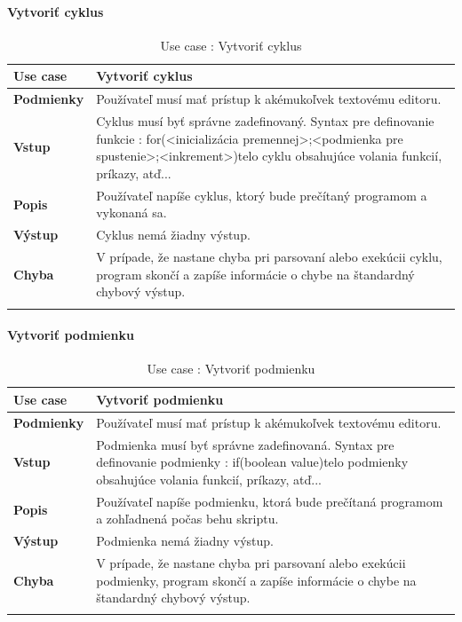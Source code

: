 \paragraph{Vytvoriť cyklus}
\begin{center}
	\begin{longtable}{|p{2.5cm}|p{12.2cm}|}
		
			\hline
			\textbf{Use case} & Vytvoriť cyklus \\ 
			\hline
			\textbf{Podmienky} & Používateľ musí mať prístup k akémukoľvek textovému editoru.  \\ 
			\hline
			\textbf{Vstup} & Cyklus musí byť správne zadefinovaný. 
			Syntax pre definovanie funkcie : 
			\newline
			for(<inicializácia premennej>;<podmienka pre spustenie>;<inkrement>){telo cyklu obsahujúce volania funkcií, príkazy, atď..}. \\
			\hline

			\textbf{Popis} & Používateľ napíše cyklus, ktorý bude prečítaný programom a vykonaná sa.\\ 
			\hline
			\textbf{Výstup} & Cyklus nemá žiadny výstup.\\
			\hline
			\textbf{Chyba} & V prípade, že nastane chyba pri parsovaní alebo exekúcii cyklu, program skončí a zapíše informácie o chybe na štandardný chybový výstup.\\
			\hline
		\caption{Use case : Vytvoriť cyklus}
		\label{table:1}
		
	\end{longtable}
\end{center}
\paragraph{Vytvoriť podmienku}
\begin{center}
	\begin{longtable}{|p{2.5cm}|p{12.2cm}|}
		
			\hline
			\textbf{Use case} & Vytvoriť podmienku \\ 
			\hline
			\textbf{Podmienky} & Používateľ musí mať prístup k akémukoľvek textovému editoru.  \\ 
			\hline
			\textbf{Vstup} & Podmienka musí byť správne zadefinovaná. 
			Syntax pre definovanie podmienky : 
			\newline
			if(boolean value){telo podmienky obsahujúce volania funkcií, príkazy, atď..}. \\
			\hline
			\textbf{Popis} & Používateľ napíše podmienku, ktorá bude prečítaná programom a zohľadnená počas behu skriptu.\\ 
			\hline
			\textbf{Výstup} & Podmienka nemá žiadny výstup.\\
			\hline
			\textbf{Chyba} & V prípade, že nastane chyba pri parsovaní alebo exekúcii podmienky, program skončí a zapíše informácie o chybe na štandardný chybový výstup.\\
			\hline
		\caption{Use case : Vytvoriť podmienku}
		\label{table:1}
		
	\end{longtable}
\end{center}
